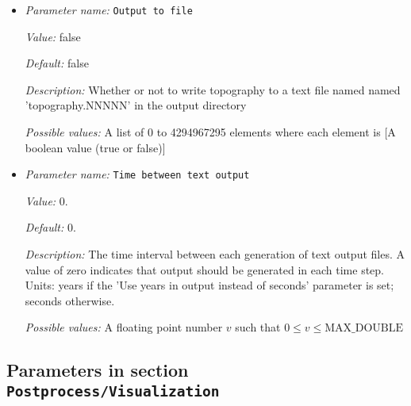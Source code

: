 \begin{itemize}
\item {\it Parameter name:} {\tt Output to file}
\label{parameters:Postprocess/Topography/Output to file}
\label{parameters:Postprocess/Topography/Output_20to_20file}


{\it Value:} false


{\it Default:} false


{\it Description:} Whether or not to write topography to a text file named named 'topography.NNNNN' in the output directory


{\it Possible values:} A list of 0 to 4294967295 elements where each element is [A boolean value (true or false)]
\item {\it Parameter name:} {\tt Time between text output}
\label{parameters:Postprocess/Topography/Time between text output}
\label{parameters:Postprocess/Topography/Time_20between_20text_20output}


{\it Value:} 0.


{\it Default:} 0.


{\it Description:} The time interval between each generation of text output files. A value of zero indicates that output should be generated in each time step. Units: years if the 'Use years in output instead of seconds' parameter is set; seconds otherwise.


{\it Possible values:} A floating point number $v$ such that $0 \leq v \leq \text{MAX\_DOUBLE}$
\end{itemize}

\subsection{Parameters in section \tt Postprocess/Visualization}
\label{parameters:Postprocess/Visualization}

